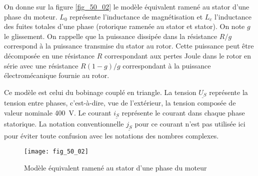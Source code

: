\ifprof
\else
\fi

\ifprof
\else
\fi

\ifprof
\else

On donne sur la figure \autoref{fig_50_02} le modèle équivalent ramené au stator d’une phase du moteur.
$L_0$ représente l’inductance de magnétisation et $L_c$ l’inductance des fuites totales d’une
phase (rotorique ramenée au stator et stator). On note $g$ le glissement. On rappelle que la
puissance dissipée dans la résistance $R/g$ correspond à la puissance transmise du stator
au rotor. Cette puissance peut être décomposée en une résistance $R$ correspondant aux
pertes Joule dans le rotor en série avec une résistance $R(1 - g)/g$ correspondant à la
puissance électromécanique fournie au rotor.

\begin{rem}
Ce modèle est celui du bobinage couplé en triangle. La tension $\underline{U_S}$ représente
la tension entre phases, c’est-à-dire, vue de l’extérieur, la tension composée de valeur
nominale \SI{400}{V}. Le courant $\underline{i_S}$ représente le courant dans chaque phase statorique. La
notation conventionnelle $\underline{j_S}$ pour ce courant n’est pas utilisée ici pour éviter toute confusion
avec les notations des nombres complexes.
\end{rem}

\begin{figure}[H]
\centering
\texttt{[image: fig\_50\_02]}
\caption{Modèle équivalent ramené au stator d’une phase du moteur \label{fig_50_02}}
\end{figure}
\fi
{}
\ifprof
\else
\fi


\ifprof
\else
\fi

\ifprof
\else
\fi

